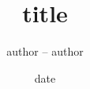 
\usepackage{hyperref}

\usepackage{colortbl}

\usepackage{listings}

\title[substitute tile for the page bottom]{title}
\author{author -- author}
\date{date}

